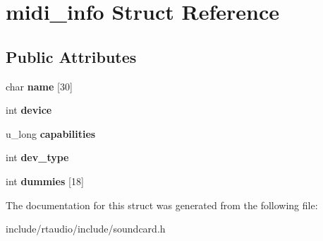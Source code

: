 \hypertarget{structmidi__info}{}\section{midi\+\_\+info Struct Reference}
\label{structmidi__info}
\subsection*{Public Attributes}
\begin{DoxyCompactItemize}
\item 
char {\bfseries name} \mbox{[}30\mbox{]}\hypertarget{structmidi__info_a4ea1abee72f3d30ac26f60a0136390bf}{}\label{structmidi__info_a4ea1abee72f3d30ac26f60a0136390bf}

\item 
int {\bfseries device}\hypertarget{structmidi__info_a366b0f6fdea85326acec3742e205e2c4}{}\label{structmidi__info_a366b0f6fdea85326acec3742e205e2c4}

\item 
u\+\_\+long {\bfseries capabilities}\hypertarget{structmidi__info_a805c5944a074ea96dc05cf368d6221e3}{}\label{structmidi__info_a805c5944a074ea96dc05cf368d6221e3}

\item 
int {\bfseries dev\+\_\+type}\hypertarget{structmidi__info_a62b57c1e9a95c19fb4df29621d96ea7b}{}\label{structmidi__info_a62b57c1e9a95c19fb4df29621d96ea7b}

\item 
int {\bfseries dummies} \mbox{[}18\mbox{]}\hypertarget{structmidi__info_a443588457f703e64b027bcc782eca174}{}\label{structmidi__info_a443588457f703e64b027bcc782eca174}

\end{DoxyCompactItemize}


The documentation for this struct was generated from the following file\+:\begin{DoxyCompactItemize}
\item 
include/rtaudio/include/soundcard.\+h\end{DoxyCompactItemize}
